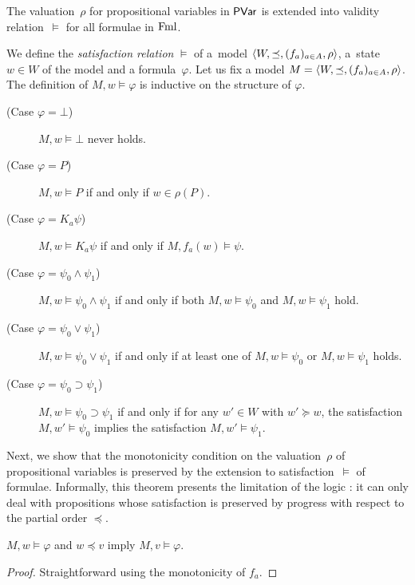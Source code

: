        The valuation~$\rho$ for propositional variables in $\mathsf{PVar}$ is extended into validity
       relation~$\models$ for all formulae in $\mathsf{\operatorname{Fml}}$.
       \begin{definition}
	We define the \textit{satisfaction relation} $\models$ of a~model
	$\langle{W,\preceq,(f_a)_{a\in A},\rho}\rangle$, a~state~$w\in W$ of the model and a
	formula~$\varphi$.
	Let us fix a model $M=\langle{W,\preceq,(f_a)_{a\in A},\rho}\rangle$.
	\newcommand{\m}{M}
	The definition of $M,w\models\varphi$ is inductive on the structure of $\varphi$.
	\begin{description}
	 \item[(Case $\varphi=\bot$)] $\m, w\models \bot$ never holds.
	 \item[(Case $\varphi= P$)] $\m, w\models P$ if and only if
	      $w \in
	      \rho(P)$.
	 \item[(Case $\varphi = K_a \psi$)]
	      $\m, w\models K_a \psi$ if and only if
	      $\m, f_a(w)\models \psi$.
	 \item[(Case $\varphi = \psi_0\land\psi_1$)]
	      $\m, w\models \psi_0\land\psi_1$ if and only if both
	      $\m, w\models \psi_0$ and $\m,w\models \psi_1$ hold.
	 \item[(Case $\varphi = \psi_0\vee\psi_1$)]
	      $\m, w\models \psi_0\vee\psi_1$ if and only if at least
	      one of
	      $\m, w\models \psi_0$ or $\m,w\models \psi_1$ holds.
	 \item[(Case $\varphi = \psi_0\supset \psi_1$)]
	      $\m, w\models \psi_0\supset\psi_1$ if and only if
	      for any $w'\in W$ with $w'\succeq w$, the satisfaction $M,w'\models \psi_0$ implies
	      the satisfaction $M, w'\models
	      \psi_1$.
	\end{description}
       \end{definition}

       Next, we show that the monotonicity condition on the valuation~$\rho$ of
       propositional variables is preserved by the extension
       to satisfaction~$\models$ of formulae. Informally, this theorem presents the limitation of the logic \iec:
       it can only deal with propositions whose satisfaction is preserved by progress with respect to
       the partial order $\preceq$.
       \begin{theorem}
	\label{kripke}
	$M,w\models \varphi$ and $w\preceq v$ imply
	$M,v\models \varphi$.
       \end{theorem}
       \begin{proof}
	Straightforward using the monotonicity of $f_a$.
       \end{proof}


